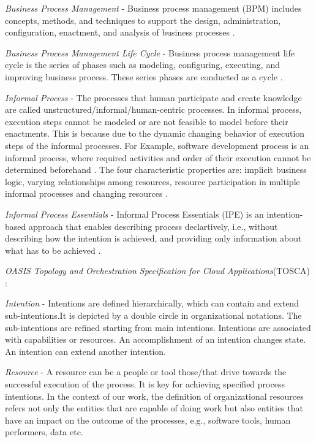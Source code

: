 \textit{Business Process Management} - Business process management (BPM) includes concepts, methods, and techniques to support the design, administration, configuration, enactment, and analysis of business processes \cite{Weske2012}.

\textit{Business Process Management Life Cycle} - Business process management life cycle is the series of phases such as modeling, configuring, executing, and improving business process. These series phases are conducted as a cycle \cite{Weske2012}.

\textit{Informal Process} - The processes that human participate and create knowledge are called unstructured/informal/human-centric processes. In informal process, execution steps cannot be modeled or are not feasible to model before their enactments. This is because due to the dynamic changing behavior of execution steps of the informal processes.  For Example, software development process is an informal process, where required activities and order of their execution cannot be determined beforehand \cite{Sungur2015}. The four characteristic properties are: implicit business logic, varying relationships among resources, resource participation in multiple informal processes and changing resources \cite{Sungur2014a}.    

\textit{Informal Process Essentials} - Informal Process Essentials (IPE) is an intention-based approach that enables describing process declartively, i.e., without describing how the intention is achieved, and providing only information about what has to be achieved \cite{Sungur2014a}. 

\textit{OASIS Topology and Orchestration Specification for Cloud Applications}(TOSCA) :
 
\textit{Intention} - Intentions are defined hierarchically, which can contain and extend sub-intentions.It is depicted by a double circle in organizational notations. The sub-intentions are refined starting from main intentions. Intentions are associated with capabilities or resources. An accomplishment of an intention changes state. An intention can extend another intention.        

\textit{Resource} - A resource can be a people or tool those/that drive towards the successful execution of the process. It is key for achieving specified process intentions. In the context of our work, the definition of organizational resources refers not only the entities that are capable of doing work but also entities that have an impact on the outcome of the processes, e.g., software tools, human performers, data etc.      

